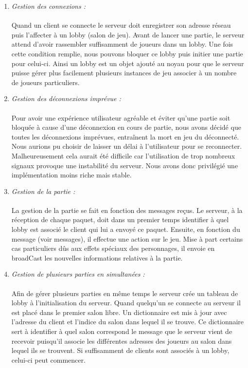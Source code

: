 \documentclass[a4paper,11pt]{article}
\begin{document}
\begin{enumerate}[label=(\roman*)]
	\item \textit{Gestion des connexions :} \\\\
	Quand un client se connecte le serveur doit enregistrer son adresse réseau puis l’affecter à un lobby (salon de jeu). Avant de lancer une partie, le serveur attend d’avoir rassembler suffisamment de joueurs dans un lobby. Une fois cette condition remplie, nous pouvons bloquer ce lobby puis initier une partie pour celui-ci. Ainsi un lobby est un objet ajouté au noyau pour que le serveur puisse gérer plus facilement plusieurs instances de jeu associer à un nombre de joueurs particuliers.\\

	
	\item \textit{Gestion des déconnexions imprévue :} \\\\
	Pour avoir une expérience utilisateur agréable et éviter qu’une partie soit bloquée à cause d’une déconnexion en cours de partie, nous avons décidé que toutes les déconnexions imprévues, entraînent la mort en jeu du déconnecté. Nous aurions pu choisir de laisser un délai à l’utilisateur pour se reconnecter. Malheureusement cela aurait été difficile car l’utilisation de trop nombreux signaux provoque une instabilité du serveur. Nous avons donc privilégié une implémentation moins riche mais stable.\\

	\item \textit{Gestion de la partie :} \\\\
	La gestion de la partie se fait en fonction des messages reçus. Le serveur, à la réception de chaque paquet, doit dans un premier temps identifier à quel lobby est associé le client qui lui a envoyé ce paquet. Ensuite, en fonction du message (voir messages), il effectue une action sur le jeu. Mise à part certains cas particuliers dûs aux effets spéciaux des personnages, il envoie en broadCast les nouvelles informations relatives à la partie.\\

\newpage

	\item \textit{Gestion de plusieurs parties en simultanées :} \\\\
	Afin de gérer plusieurs parties en même temps le serveur crée un tableau de lobby à l'initialisation du serveur. Quand quelqu’un se connecte au serveur il est placé dans le premier salon libre. Un dictionnaire est mis à jour avec l’adresse du client et l’indice du salon dans lequel il se trouve. Ce dictionnaire sert à identifier à quel salon correspond le message que le serveur vient de recevoir puisqu’il associe les différentes adresses des joueurs au salon dans lequel ils se trouvent. Si suffisamment de clients sont associés à un lobby, celui-ci peut commencer. \\


\end{enumerate}
\end{document}
